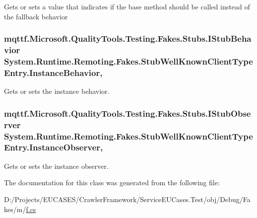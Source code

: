 Gets or sets a value that indicates if the base method should be called instead of the fallback behavior

\hypertarget{class_system_1_1_runtime_1_1_remoting_1_1_fakes_1_1_stub_well_known_client_type_entry_a89b2aec3cab886a47bfc4b8a71f0acf2}{
\subsubsection[{Instance\-Behavior}]{\setlength{\rightskip}{0pt plus 5cm}mqttf.\-Microsoft.\-Quality\-Tools.\-Testing.\-Fakes.\-Stubs.\-I\-Stub\-Behavior System.\-Runtime.\-Remoting.\-Fakes.\-Stub\-Well\-Known\-Client\-Type\-Entry.\-Instance\-Behavior\hspace{0.3cm}{\ttfamily [get]}, {\ttfamily [set]}}}\label{class_system_1_1_runtime_1_1_remoting_1_1_fakes_1_1_stub_well_known_client_type_entry_a89b2aec3cab886a47bfc4b8a71f0acf2}


Gets or sets the instance behavior.

\hypertarget{class_system_1_1_runtime_1_1_remoting_1_1_fakes_1_1_stub_well_known_client_type_entry_ad0a0341a5a98082014d2cd005b314617}{
\subsubsection[{Instance\-Observer}]{\setlength{\rightskip}{0pt plus 5cm}mqttf.\-Microsoft.\-Quality\-Tools.\-Testing.\-Fakes.\-Stubs.\-I\-Stub\-Observer System.\-Runtime.\-Remoting.\-Fakes.\-Stub\-Well\-Known\-Client\-Type\-Entry.\-Instance\-Observer\hspace{0.3cm}{\ttfamily [get]}, {\ttfamily [set]}}}\label{class_system_1_1_runtime_1_1_remoting_1_1_fakes_1_1_stub_well_known_client_type_entry_ad0a0341a5a98082014d2cd005b314617}


Gets or sets the instance observer.



The documentation for this class was generated from the following file\-:\begin{DoxyCompactItemize}
\item 
D\-:/\-Projects/\-E\-U\-C\-A\-S\-E\-S/\-Crawler\-Framework/\-Service\-E\-U\-Cases.\-Test/obj/\-Debug/\-Fakes/m/\hyperlink{m_2f_8cs}{f.\-cs}\end{DoxyCompactItemize}
